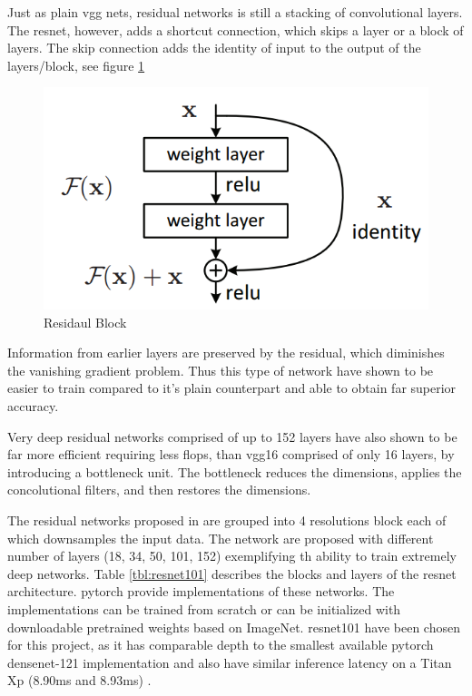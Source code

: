 Just as plain \gls{vgg} nets, residual networks is still a stacking of convolutional layers. The \gls{resnet}, however, adds a shortcut connection, which skips a layer or a block of layers. The skip connection adds the identity of input to the output of the layers/block, see figure \ref{fig:residualblock}

\begin{figure}
	\centering
	\includegraphics[width=.5\linewidth]{figures/models/residualblock}
	\caption[Residual Block]{Residaul Block}
	\label{fig:residualblock}
\end{figure}

Information from earlier layers are preserved by the residual, which diminishes the vanishing gradient problem. Thus this type of network have shown to be easier to train compared to it’s plain counterpart and able to obtain far superior accuracy.  

Very deep residual networks comprised of up to 152 layers have also shown to be far more efficient requiring less \gls{flop}s, than \gls{vgg}16 comprised of only 16 layers, by introducing a bottleneck unit. The bottleneck reduces the dimensions, applies the concolutional filters, and then restores the dimensions.

The residual networks proposed in \cite{he_deep_2015} are grouped into 4 resolutions block each of which downsamples the input data. The network are proposed with different number of layers (18, 34, 50, 101, 152) exemplifying th ability to train extremely deep networks. Table \ref{tbl:resnet101} describes the blocks and layers of the \gls{resnet} architecture. \gls{pytorch} provide implementations of these networks. The implementations can be trained from scratch or can be initialized with downloadable pretrained weights based on ImageNet. \gls{resnet}101 have been chosen for this project, as it has comparable depth to the smallest available \gls{pytorch} \gls{densenet}-121 implementation and also have similar inference latency on a Titan Xp (8.90ms and 8.93ms) \cite{bianco_benchmark_2018}.

